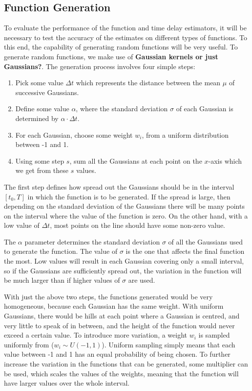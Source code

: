 \documentclass[a4paper,11pt]{article}
\begin{document}
\subsection{Function Generation}
\label{sec-5-1}

   To evaluate the performance of the function and time delay estimators, it will
   be necessary to test the accuracy of the estimates on different types of
   functions. To this end, the capability of generating random functions will be
   very useful. To generate random functions, we make use of \textbf{Gaussian
   kernels or just Gaussians?}. The generation process involves four simple steps:
\begin{enumerate}
\item Pick some value $\Delta t$ which represents the distance between the mean
   $\mu$ of successive Gaussians.
\item Define some value $\alpha$, where the standard deviation $\sigma$ of each
   Gaussian is determined by $\alpha\cdot\Delta t$.
\item For each Gaussian, choose some weight $w_i$, from a uniform distribution
   between -1 and 1.
\item Using some step $s$, sum all the Gaussians at each point on the $x$-axis which
   we get from these $s$ values.
\end{enumerate}

   The first step defines how spread out the Gaussians should be in the interval
   $[t_0, T]$ in which the function is to be generated. If the spread is large,
   then depending on the standard deviation of the Gaussians there will be many
   points on the interval where the value of the function is zero. On the other
   hand, with a low value of $\Delta t$, most points on the line should have some
   non-zero value.

   The $\alpha$ parameter determines the standard deviation $\sigma$ of all the Gaussians
   used to generate the function. The value of $\sigma$ is the one that affects the
   final function the most. Low values will result in each Gaussian covering only a
   small interval, so if the Gaussians are sufficiently spread out, the variation
   in the function will be much larger than if higher values of $\sigma$ are used.

   With just the above two steps, the functions generated would be very
   homogeneous, because each Gaussian has the same weight. With uniform Gaussians,
   there would be hills at each point where a Gaussian is centred, and very little
   to speak of in between, and the height of the function would never exceed a
   certain value. To introduce more variation, a weight $w_i$ is sampled uniformly
   from ($w_i \sim U(-1,1)$). Uniform sampling simply means that each value between
   -1 and 1 has an equal probability of being chosen. To further increase the
   variation in the functions that can be generated, some multiplier can be used,
   which scales the values of the weights, meaning that the function will have
   larger values over the whole interval.
\end{document}
